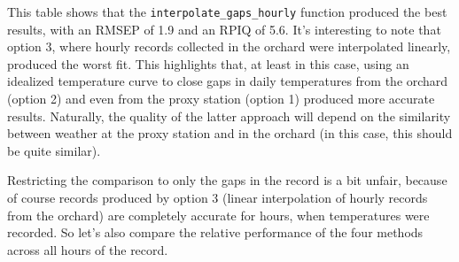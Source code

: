 \documentclass[
]{book}
\newenvironment{Shaded}{\begin{snugshade}}{\end{snugshade}}
\newcommand{\DataTypeTok}[1]{\textcolor[rgb]{0.13,0.29,0.53}{#1}}
\newcommand{\DecValTok}[1]{\textcolor[rgb]{0.00,0.00,0.81}{#1}}
\newcommand{\KeywordTok}[1]{\textcolor[rgb]{0.13,0.29,0.53}{\textbf{#1}}}
\newcommand{\NormalTok}[1]{#1}
\newcommand{\OperatorTok}[1]{\textcolor[rgb]{0.81,0.36,0.00}{\textbf{#1}}}
\newcommand{\OtherTok}[1]{\textcolor[rgb]{0.56,0.35,0.01}{#1}}
\newcommand{\StringTok}[1]{\textcolor[rgb]{0.31,0.60,0.02}{#1}}
\begin{document}
This table shows that the \texttt{interpolate\_gaps\_hourly} function produced the best results, with an RMSEP of 1.9 and an RPIQ of 5.6. It's interesting to note that option 3, where hourly records collected in the orchard were interpolated linearly, produced the worst fit. This highlights that, at least in this case, using an idealized temperature curve to close gaps in daily temperatures from the orchard (option 2) and even from the proxy station (option 1) produced more accurate results. Naturally, the quality of the latter approach will depend on the similarity between weather at the proxy station and in the orchard (in this case, this should be quite similar).

Restricting the comparison to only the gaps in the record is a bit unfair, because of course records produced by option 3 (linear interpolation of hourly records from the orchard) are completely accurate for hours, when temperatures were recorded. So let's also compare the relative performance of the four methods across all hours of the record.

\begin{Shaded}
\end{Shaded}
\end{document}
